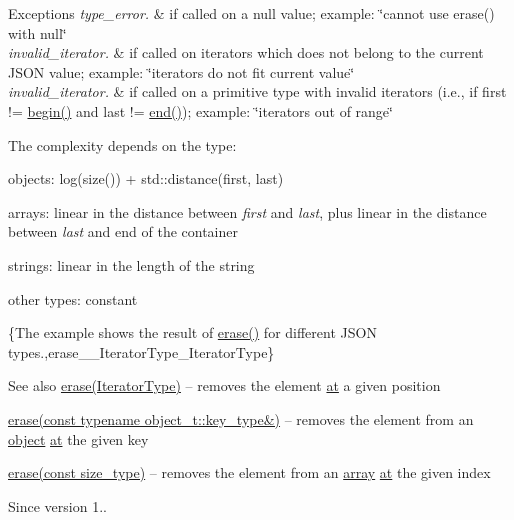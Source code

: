 \begin{DoxyExceptions}{Exceptions}
{\em type\+\_\+error.} & if called on a {\ttfamily null} value; example\+: {\ttfamily \char`\"{}cannot use
erase() with null\char`\"{}} \\
\hline
{\em invalid\+\_\+iterator.} & if called on iterators which does not belong to the current J\+S\+ON value; example\+: {\ttfamily \char`\"{}iterators do not fit current value\char`\"{}} \\
\hline
{\em invalid\+\_\+iterator.} & if called on a primitive type with invalid iterators (i.\+e., if {\ttfamily first != \hyperlink{classnlohmann_1_1basic__json_a0ff28dac23f2bdecee9564d07f51dcdc}{begin()}} and {\ttfamily last != \hyperlink{classnlohmann_1_1basic__json_a13e032a02a7fd8a93fdddc2fcbc4763c}{end()}}); example\+: {\ttfamily \char`\"{}iterators out of range\char`\"{}}\\
\hline
\end{DoxyExceptions}
The complexity depends on the type\+:
\begin{DoxyItemize}
\item objects\+: {\ttfamily log(size()) + std\+::distance(first, last)}
\item arrays\+: linear in the distance between {\itshape first} and {\itshape last}, plus linear in the distance between {\itshape last} and end of the container
\item strings\+: linear in the length of the string
\item other types\+: constant
\end{DoxyItemize}

\{The example shows the result of {\ttfamily \hyperlink{classnlohmann_1_1basic__json_a068a16e76be178e83da6a192916923ed}{erase()}} for different J\+S\+ON types.,erase\+\_\+\+\_\+\+Iterator\+Type\+\_\+\+Iterator\+Type\}

\begin{DoxySeeAlso}{See also}
\hyperlink{classnlohmann_1_1basic__json_a068a16e76be178e83da6a192916923ed}{erase(\+Iterator\+Type)} -- removes the element \hyperlink{classnlohmann_1_1basic__json_a73ae333487310e3302135189ce8ff5d8}{at} a given position 

\hyperlink{classnlohmann_1_1basic__json_a2f8484d69c55d8f2a9697a7bec29362a}{erase(const typename object\+\_\+t\+::key\+\_\+type\&)} -- removes the element from an \hyperlink{classnlohmann_1_1basic__json_a31f84ee15c4690ff705bed74736d04c6}{object} \hyperlink{classnlohmann_1_1basic__json_a73ae333487310e3302135189ce8ff5d8}{at} the given key 

\hyperlink{classnlohmann_1_1basic__json_a88cbcefe9a3f4d294bed0653550a5cb9}{erase(const size\+\_\+type)} -- removes the element from an \hyperlink{classnlohmann_1_1basic__json_a8a7d537fc297bbc5b845f92fe0445e3b}{array} \hyperlink{classnlohmann_1_1basic__json_a73ae333487310e3302135189ce8ff5d8}{at} the given index
\end{DoxySeeAlso}
\begin{DoxySince}{Since}
version 1.. 
\end{DoxySince}
